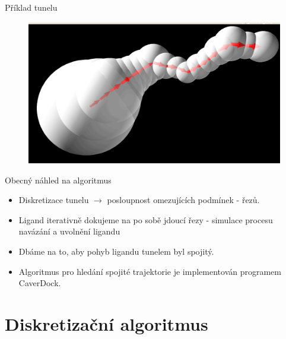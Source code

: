\documentclass{beamer}
\begin{document}
\begin{frame}{Příklad tunelu}
    \begin{figure}
        \includegraphics[width=\textwidth]{img/basic_tunnel.jpg}
    \end{figure}
\end{frame}

\begin{frame}{Obecný náhled na algoritmus}
  \begin{itemize}
  \item Diskretizace tunelu $\rightarrow$ posloupnost omezujících podmínek - řezů.
 	\item Ligand iterativně dokujeme na po sobě jdoucí řezy - simulace procesu navázání a uvolnění ligandu
 	\item Dbáme na to, aby pohyb ligandu tunelem byl spojitý.
 	\item Algoritmus pro hledání spojité trajektorie je implementován programem CaverDock.
  \end{itemize}
\end{frame}

\section{Diskretizační algoritmus}
\end{document}
